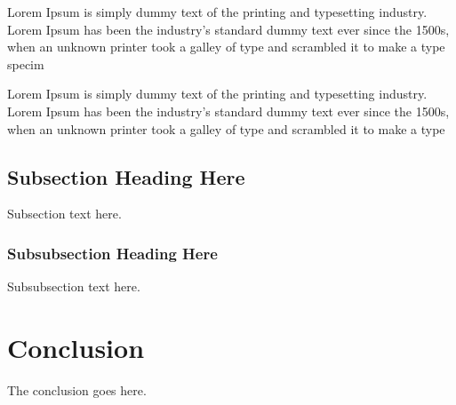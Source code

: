 \documentclass[journal]{IEEEtran}
\begin{document}
Lorem Ipsum is simply dummy text of the printing and typesetting industry. Lorem Ipsum has been the industry's standard dummy text ever since the 1500s, when an unknown printer took a galley of type and scrambled it to make a type specim\cite{BuildingMicroServices}

Lorem Ipsum is simply dummy text of the printing and typesetting industry\cite{MicroservicesYesterdayTodayTomorrow}. Lorem Ipsum has been the industry's standard dummy text ever since the 1500s, when an unknown printer took a galley of type and scrambled it to make a type
 

\subsection{Subsection Heading Here}
Subsection text here.


\subsubsection{Subsubsection Heading Here}
Subsubsection text here.


\section{Conclusion}
The conclusion goes here.


\newpage
\printbibliography

\end{document}
